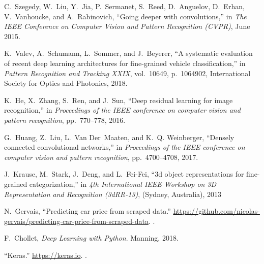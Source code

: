 \documentclass[conference]{IEEEtran}
\begin{document}
\begin{thebibliography}{99}
C.~Szegedy, W.~Liu, Y.~Jia, P.~Sermanet, S.~Reed, D.~Anguelov, D.~Erhan,
  V.~Vanhoucke, and A.~Rabinovich, ``Going deeper with convolutions,'' in {\em
  The IEEE Conference on Computer Vision and Pattern Recognition (CVPR)}, June
  2015.

K.~Valev, A.~Schumann, L.~Sommer, and J.~Beyerer, ``A systematic evaluation of
  recent deep learning architectures for fine-grained vehicle classification,''
  in {\em Pattern Recognition and Tracking XXIX}, vol.~10649, p.~1064902,
  International Society for Optics and Photonics, 2018.

K.~He, X.~Zhang, S.~Ren, and J.~Sun, ``Deep residual learning for image
  recognition,'' in {\em Proceedings of the IEEE conference on computer vision
  and pattern recognition}, pp.~770--778, 2016.

G.~Huang, Z.~Liu, L.~Van Der~Maaten, and K.~Q. Weinberger, ``Densely connected
  convolutional networks,'' in {\em Proceedings of the IEEE conference on
  computer vision and pattern recognition}, pp.~4700--4708, 2017.

J.~Krause, M.~Stark, J.~Deng, and L.~Fei-Fei, ``3d object representations for
  fine-grained categorization,'' in {\em 4th International IEEE Workshop on 3D
  Representation and Recognition (3dRR-13)}, (Sydney, Australia), 2013

N.~Gervais, ``Predicting car price from scraped data.''
  \url{https://github.com/nicolas-gervais/predicting-car-price-from-scraped-data}.
.



F.~Chollet, {\em Deep Learning with Python}.
\newblock Manning, 2018.

``{Keras}.'' \url{https://keras.io}.
\newblock [Accessed: 2020-04-13].


\end{thebibliography}
\end{document}
